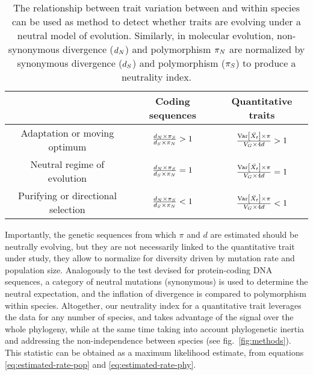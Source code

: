 \documentclass{article}
\begin{document}
\begin{table*}[tb]
    \centering
    \begin{adjustbox}{width = 0.75\textwidth}
        \begin{tabular}{|c||c|c|}
            \hline
            & Coding sequences                                  & Quantitative traits                                               \\ \hline \hline
            Adaptation or moving optimum       & $\frac{d_N \times \pi_S}{d_S \times \pi_N} > 1$ & $ \frac{\operatorname{\text{Var}} \left[\bar{X_{t}}\right] \times \pi}{ V_{G} \times 4 d } > 1 $ \\ \hline
            Neutral regime of evolution        & $\frac{d_N \times \pi_S}{d_S \times \pi_N} = 1$ & $ \frac{\operatorname{\text{Var}} \left[\bar{X_{t}}\right] \times \pi}{ V_{G} \times 4 d } = 1 $ \\ \hline
            Purifying or directional selection & $\frac{d_N \times \pi_S}{d_S \times \pi_N} < 1$ & $\frac{\operatorname{\text{Var}} \left[\bar{X_{t}}\right] \times \pi}{ V_{G} \times 4 d } < 1 $ \\ \hline
        \end{tabular}
    \end{adjustbox}
    \caption{
        The relationship between trait variation between and within species can be used as method to detect whether traits are evolving under a neutral model of evolution.
        Similarly, in molecular evolution, non-synonymous divergence ($d_N$) and polymorphism $\pi_N$ are normalized by synonymous divergence ($d_S$) and polymorphism ($\pi_S$) to produce a neutrality index\cite{mcdonald_adaptative_1991, fay_evaluating_2008}.
    }
    \label{table:unfolded-MK}
\end{table*}

Importantly, the genetic sequences from which $\pi$ and $d$ are estimated should be neutrally evolving, but they are not necessarily linked to the quantitative trait under study, they allow to normalize for diversity driven by mutation rate and population size.
Analogously to the \textcite{mcdonald_adaptative_1991} test devised for protein-coding DNA sequences, a category of neutral mutations (synonymous) is used to determine the neutral expectation, and the inflation of divergence is compared to polymorphism within species.
Altogether, our neutrality index for a quantitative trait leverages the data for any number of species, and takes advantage of the signal over the whole phylogeny, while at the same time taking into account phylogenetic inertia and addressing the non-independence between species (see fig.~\ref{fig:methods}).
This statistic can be obtained as a maximum likelihood estimate, from equations \ref{eq:estimated-rate-pop} and \ref{eq:estimated-rate-phy}.
\end{document}
